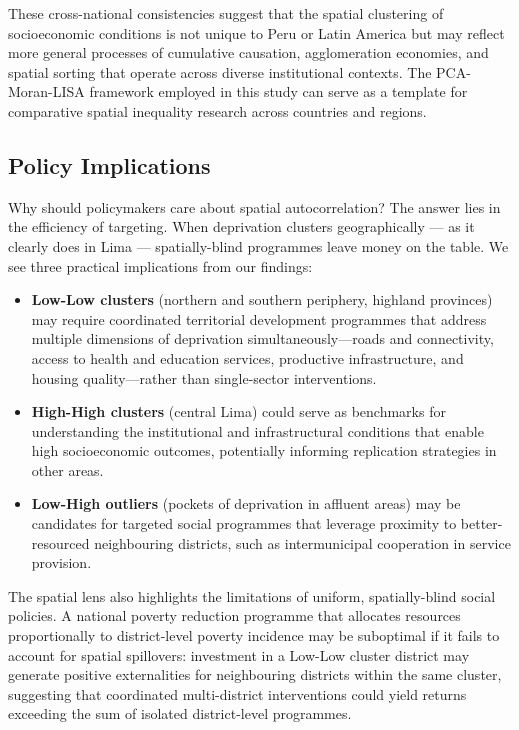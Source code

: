 \documentclass[12pt,a4paper,twoside]{article}
\begin{document}
These cross-national consistencies suggest that the spatial clustering of
socioeconomic conditions is not unique to Peru or Latin America but may reflect
more general processes of cumulative causation, agglomeration economies, and
spatial sorting that operate across diverse institutional contexts. The
PCA-Moran-LISA framework employed in this study can serve as a template for
comparative spatial inequality research across countries and regions.

\subsection{Policy Implications}

Why should policymakers care about spatial autocorrelation? The answer lies in
the efficiency of targeting. When deprivation clusters geographically --- as it
clearly does in Lima --- spatially-blind programmes leave money on the table.
We see three practical implications from our findings:

\begin{itemize}
  \item \textbf{Low-Low clusters} (northern and southern periphery, highland
        provinces) may require coordinated territorial development programmes
        that address multiple dimensions of deprivation simultaneously---roads
        and connectivity, access to health and education services, productive
        infrastructure, and housing quality---rather than single-sector
        interventions.
  \item \textbf{High-High clusters} (central Lima) could serve as benchmarks
        for understanding the institutional and infrastructural conditions that
        enable high socioeconomic outcomes, potentially informing replication
        strategies in other areas.
  \item \textbf{Low-High outliers} (pockets of deprivation in affluent areas)
        may be candidates for targeted social programmes that leverage proximity
        to better-resourced neighbouring districts, such as intermunicipal
        cooperation in service provision.
\end{itemize}

The spatial lens also highlights the limitations of uniform, spatially-blind
social policies. A national poverty reduction programme that allocates resources
proportionally to district-level poverty incidence may be suboptimal if it fails
to account for spatial spillovers: investment in a Low-Low cluster district may
generate positive externalities for neighbouring districts within the same
cluster, suggesting that coordinated multi-district interventions could yield
returns exceeding the sum of isolated district-level programmes.
\end{document}
